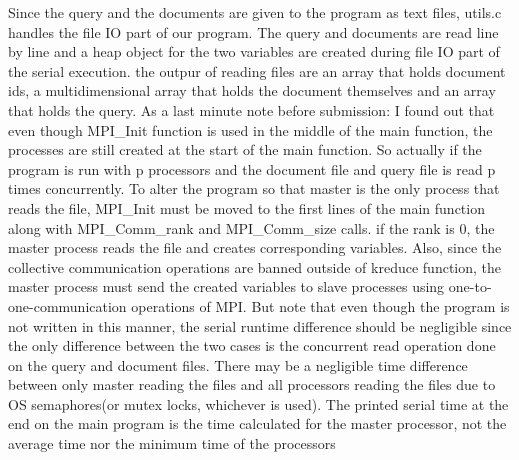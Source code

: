 \documentclass{article}
\begin{document}
\null \qquad Since the query and the documents are given to the program as text files, utils.c handles the file IO part of our program. The query and documents are read line by line and a heap object for the two variables are created during file IO part of the serial execution. the outpur of reading files are an array that holds document ids, a multidimensional array that holds the document themselves and an array that holds the query. As a last minute note before submission: I found out that even though MPI\_Init function is used in the middle of the main function, the processes are still created at the start of the main function. So actually if the program is run with p processors and the document file and query file is read p times concurrently. To alter the program so that master is the only process that reads the file, MPI\_Init must be moved to the first lines of the main function along with MPI\_Comm\_rank and MPI\_Comm\_size calls. if the rank is 0, the master process reads the file and creates corresponding variables. Also, since the collective communication operations are banned outside of kreduce function, the master process must send the created variables to slave processes using one-to-one-communication operations of MPI. But note that even though the program is not written in this manner, the serial runtime difference should be negligible since the only difference between the two cases is the concurrent read operation done on the query and document files. There may be a negligible time difference between only master reading the files and all processors reading the files due to OS semaphores(or mutex locks, whichever is used). The printed serial time at the end on the main program is the time calculated for the master processor, not the average time nor the minimum time of the processors\\
\end{document}
